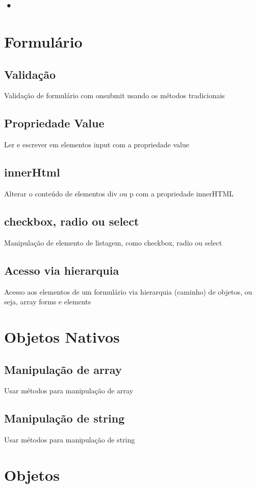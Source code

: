 \subsection{•}


\section{Formulário}
\subsection{Validação}
Validação de formulário com onsubmit usando os métodos tradicionais
\subsection{Propriedade Value}
Ler e escrever em elementos input com a propriedade value
\subsection{innerHtml}
Alterar o conteúdo de elementos div ou p com a propriedade innerHTML
\subsection{checkbox, radio ou select}
Manipulação de elemento de listagem, como checkbox, radio ou select
\subsection{Acesso via hierarquia}
Acesso aos elementos de um formulário via hierarquia (caminho) de objetos, ou seja, array forms e elements

\section{Objetos Nativos }
\subsection{Manipulação de array}
Usar métodos para manipulação de array
\subsection{Manipulação de string}
Usar métodos para manipulação de string

\section{Objetos}
